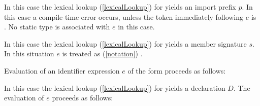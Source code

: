 \documentclass[makeidx]{article}
\begin{document}
{\LMHash{}%
In this case the lexical lookup
(\ref{lexicalLookup})
for \id{} yields an import prefix $p$.
In this case a compile-time error occurs,
unless the token immediately following $e$ is .
No static type is associated with $e$ in this case.

\EndCase

\LMHash{}%
In this case the lexical lookup
(\ref{lexicalLookup})
for \id{} yields a member signature $s$.
%
In this situation $e$ is treated as
(\ref{notation})
.

\EndCase

\LMHash{}%
Evaluation of an identifier expression $e$ of the form \id{}
proceeds as follows:

\LMHash{}%
In this case the lexical lookup
(\ref{lexicalLookup})
for \id{} yields a declaration $D$.
The evaluation of $e$ proceeds as follows:

}
\end{document}
